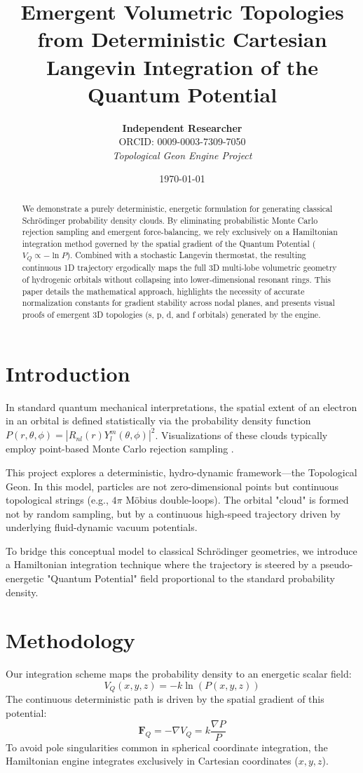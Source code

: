 \documentclass[a4paper,11pt]{article}
\title{\textbf{Emergent Volumetric Topologies from Deterministic Cartesian Langevin Integration of the Quantum Potential}}
\author{
    \textbf{Independent Researcher} \\
    ORCID: 0009-0003-7309-7050 \\
    \textit{Topological Geon Engine Project}
}
\date{\today}
\begin{document}
\maketitle

\begin{abstract}
We demonstrate a purely deterministic, energetic formulation for generating classical Schrödinger probability density clouds. By eliminating probabilistic Monte Carlo rejection sampling and emergent force-balancing, we rely exclusively on a Hamiltonian integration method governed by the spatial gradient of the Quantum Potential ($V_Q \propto -\ln P$). Combined with a stochastic Langevin thermostat, the resulting continuous 1D trajectory ergodically maps the full 3D multi-lobe volumetric geometry of hydrogenic orbitals without collapsing into lower-dimensional resonant rings. This paper details the mathematical approach, highlights the necessity of accurate normalization constants for gradient stability across nodal planes, and presents visual proofs of emergent 3D topologies (s, p, d, and f orbitals) generated by the engine.
\end{abstract}

\section{Introduction}
In standard quantum mechanical interpretations, the spatial extent of an electron in an orbital is defined statistically via the probability density function $P(r, \theta, \phi) = |R_{nl}(r)Y_l^m(\theta, \phi)|^2$. Visualizations of these clouds typically employ point-based Monte Carlo rejection sampling \cite{schrodinger1926}.

This project explores a deterministic, hydro-dynamic framework—the Topological Geon. In this model, particles are not zero-dimensional points but continuous topological strings (e.g., $4\pi$ Möbius double-loops). The orbital "cloud" is formed not by random sampling, but by a continuous high-speed trajectory driven by underlying fluid-dynamic vacuum potentials.

To bridge this conceptual model to classical Schrödinger geometries, we introduce a Hamiltonian integration technique where the trajectory is steered by a pseudo-energetic "Quantum Potential" field proportional to the standard probability density.

\section{Methodology}
Our integration scheme maps the probability density to an energetic scalar field:
\begin{equation}
    V_Q(x,y,z) = -k \ln \left( P(x,y,z) \right)
\end{equation}
The continuous deterministic path is driven by the spatial gradient of this potential:
\begin{equation}
    \mathbf{F}_Q = -\nabla V_Q = k \frac{\nabla P}{P}
\end{equation}
To avoid pole singularities common in spherical coordinate integration, the Hamiltonian engine integrates exclusively in Cartesian coordinates ($x,y,z$).
\end{document}
